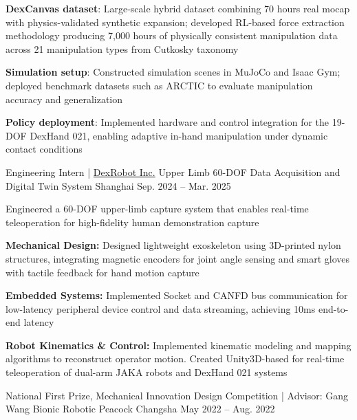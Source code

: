 \begin{cventries}
    \cventry
      {}
      {}
      {}
      {}
      {
        \vspace{-10mm}
        \begin{cvitems}
          \item{\textbf{DexCanvas dataset}: Large-scale hybrid dataset combining 70 hours real mocap with physics-validated synthetic expansion; developed RL-based force extraction methodology producing 7,000 hours of physically consistent manipulation data across 21 manipulation types from Cutkosky taxonomy}
          \item{\textbf{Simulation setup}: Constructed simulation scenes in MuJoCo and Isaac Gym; deployed benchmark datasets such as ARCTIC to evaluate manipulation accuracy and generalization}
          \item{\textbf{Policy deployment}: Implemented hardware and control integration for the 19-DOF DexHand 021, enabling adaptive in-hand manipulation under dynamic contact conditions}
        \end{cvitems}
      }
  \cventry
    {Engineering Intern | \href{https://dex-robot.com}{DexRobot Inc.}} %
    {Upper Limb 60-DOF Data Acquisition and Digital Twin System} %
    {Shanghai} %
    {Sep. 2024 -- Mar. 2025} %
    {
      Engineered a 60-DOF upper-limb capture system that enables real-time teleoperation for high-fidelity human demonstration capture
      \begin{cvitems}
        \item{\textbf{Mechanical Design:} Designed lightweight exoskeleton using 3D-printed nylon structures, integrating magnetic encoders for joint angle sensing and smart gloves with tactile feedback for hand motion capture}
        \item{\textbf{Embedded Systems:} Implemented Socket and CANFD bus communication for low-latency peripheral device control and data streaming, achieving 10ms end-to-end latency}
        \item{\textbf{Robot Kinematics \& Control:} Implemented kinematic modeling and mapping algorithms to reconstruct operator motion. Created Unity3D-based for real-time teleoperation of dual-arm JAKA robots and DexHand 021 systems}
      \end{cvitems}
    }
    \cventry
      {National First Prize, Mechanical Innovation Design Competition | Advisor: Gang Wang} %
      {Bionic Robotic Peacock} %
      {Changsha} %
      {May 2022 -- Aug. 2022} %

\end{cventries}
